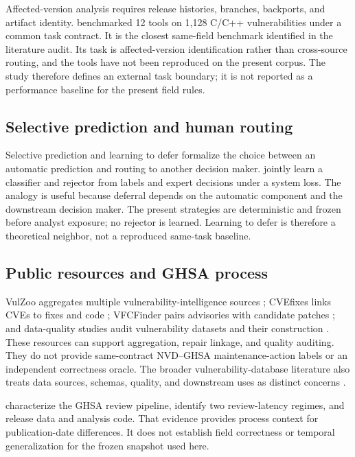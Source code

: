 \documentclass[preprint,review,12pt,authoryear]{elsarticle}
\begin{document}
Affected-version analysis requires release histories, branches, backports, and
artifact identity. \citet{Chen2025AffectedVersions} benchmarked 12 tools on
1,128 C/C++ vulnerabilities under a common task contract. It is the closest
same-field benchmark identified in the literature audit. Its task is
affected-version identification rather than cross-source routing, and the tools
have not been reproduced on the present corpus. The study therefore defines an
external task boundary; it is not reported as a performance baseline for the
present field rules.

\subsection{Selective prediction and human routing}

Selective prediction and learning to defer formalize the choice between an
automatic prediction and routing to another decision maker.
\citet{Mozannar2020Defer} jointly learn a classifier and rejector from labels and
expert decisions under a system loss. The analogy is useful because deferral
depends on the automatic component and the downstream decision maker. The
present strategies are deterministic and frozen before analyst exposure; no
rejector is learned. Learning to defer is therefore a theoretical neighbor, not
a reproduced same-task baseline.

\subsection{Public resources and GHSA process}

VulZoo aggregates multiple vulnerability-intelligence sources
\citep{Ruan2024VulZoo}; CVEfixes links CVEs to fixes and code
\citep{Bhandari2021CVEfixes}; VFCFinder pairs advisories with candidate patches
\citep{Dunlap2024VFCFinder}; and data-quality studies audit vulnerability
datasets and their construction \citep{Croft2023DataQuality}. These resources
can support aggregation, repair linkage, and quality auditing. They do not
provide same-contract NVD--GHSA maintenance-action labels or an independent
correctness oracle. The broader vulnerability-database literature also treats
data sources, schemas, quality, and downstream uses as distinct concerns
\citep{Li2023Anatomy}.

\citet{Segal2026GHSA} characterize the GHSA review pipeline, identify two
review-latency regimes, and release data and analysis code. That evidence
provides process context for publication-date differences. It does not establish
field correctness or temporal generalization for the frozen snapshot used here.
\end{document}
